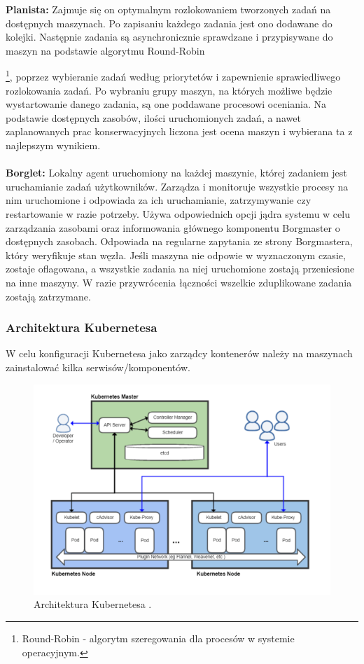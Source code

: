 \documentclass[12pt]{report}
\let\Oldsubsubsection\subsubsection
\renewcommand{\subsubsection}{\FloatBarrier\Oldsubsubsection}
\begin{document}
{\bf Planista:} Zajmuje się on optymalnym rozlokowaniem tworzonych zadań na dostęp\-nych maszynach. Po zapisaniu każdego zadania jest ono dodawane do kolejki. Następnie zadania są asynchronicznie sprawdzane i przypisywane do maszyn na podstawie algorytmu Round-Robin{\footnote{Round-Robin - algorytm szeregowania dla procesów w systemie operacyjnym.}, poprzez wybieranie zadań według priorytetów i zapewnienie sprawiedliwego rozlokowania zadań. Po wybraniu grupy maszyn, na których możliwe będzie wystartowanie danego zadania, są one poddawane procesowi oceniania. Na podstawie dostępnych zasobów, ilości uruchomionych zadań, a nawet zaplanowanych prac konserwacyjnych liczona jest ocena maszyn i wybierana ta z najlepszym wynikiem. \\ \\
{\bf Borglet:} Lokalny agent uruchomiony na każdej maszynie, której zadaniem jest uruchamianie zadań użytkowników. Zarządza i monitoruje wszystkie procesy na nim uruchomione i odpowiada za ich uruchamianie, zatrzymywanie czy restartowanie w razie potrzeby. Używa odpowiednich opcji jądra systemu w celu zarządzania zasobami oraz informowania głównego komponentu Borgmaster o dostępnych zasobach. Odpowiada na regularne zapytania ze strony Borgmastera, który weryfikuje stan węzła. Jeśli maszyna nie odpowie w wyznaczonym czasie, zostaje oflagowana, a wszystkie zadania na niej uruchomione zostają przeniesione na inne maszyny. W razie przywrócenia łączności wszelkie zduplikowane zadania zostają zatrzymane.

\subsubsection{Architektura Kubernetesa}

W celu konfiguracji Kubernetesa jako zarządcy kontenerów należy na maszynach zainstalować kilka serwisów/komponentów.

\begin{figure}[h]
	\centering
	\includegraphics[width=1\textwidth]{images/kubernetesArch.png}
	\caption{Architektura Kubernetesa \cite{kubernetesArchImg}.}
\end{figure}

}
\end{document}
